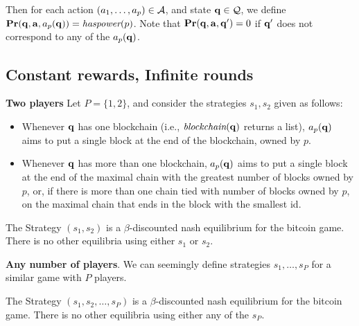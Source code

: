 \documentclass{article}
\begin{document}
Then for each action $(a_1,\dots,a_p) \in \mathcal{A}$, and state $\mathbf{q} \in \mathcal{Q}$, we 
define $\mathbf{Pr}(\mathbf{q}, \mathbf{a}, a_p(\mathbf{q})) = \textit{haspower}(p)$. Note that $\mathbf{Pr}(\mathbf{q}, \mathbf{a}, \mathbf{q}') = 0$ if $\mathbf{q}'$ does not correspond to any of the $a_p(\mathbf{q})$. 

\subsection{Constant rewards, Infinite rounds}

\medskip
\noindent
\textbf{Two players}
Let $P = \{1,2\}$, and consider the strategies $s_1,s_2$ given as follows: 
\begin{itemize}
\item Whenever $\mathbf{q}$ has one blockchain (i.e., $\textit{blockchain}(\mathbf{q})$ returns a list), $a_p(\mathbf{q})$ aims to put a single block at the end of the 
blockchain, owned by $p$. 
\item Whenever $\mathbf{q}$ has more than one blockchain, $a_p(\mathbf{q})$ aims to put a single block at the end of the maximal chain with the 
greatest number of blocks owned by $p$, or, if there is more than one chain tied with number of blocks owned by $p$, on the maximal chain that ends in the block with the smallest id. 
\end{itemize}

\begin{myprop}
The Strategy $(s_1,s_2)$ is a $\beta$-discounted nash equilibrium for the bitcoin game. There is no other equilibria using either $s_1$ or 
$s_2$. 
\end{myprop}

\medskip
\noindent
\textbf{Any number of players}. We can seemingly define strategies $s_1,\dots,s_P$ for a similar game with $P$ players. 

\begin{myprop}
The Strategy $(s_1,s_2,\dots,s_P)$ is a $\beta$-discounted nash equilibrium for the bitcoin game. There is no other equilibria using either any of the $s_P$. 
\end{myprop}
\end{document}
